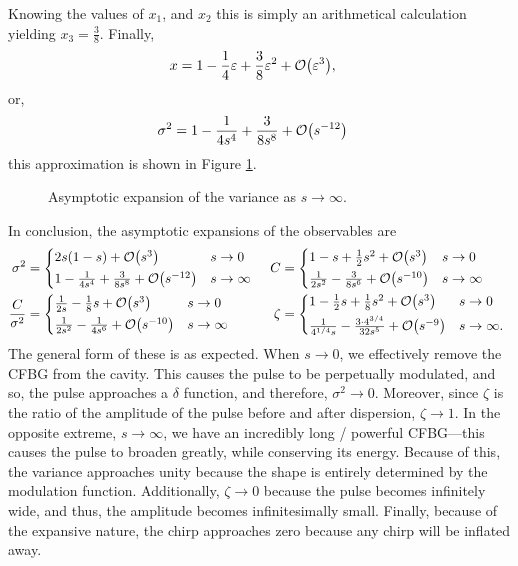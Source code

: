 Knowing the values of $x_1$, and $x_2$ this is simply an arithmetical calculation yielding $x_3 = \frac{3}{8}$. Finally,
\begin{align*}
x &= 1 - \frac{1}{4}\eps + \frac{3}{8}\eps^2 + \bigO{\eps^3},
\end{align*}
or,
\begin{align*}
\sigma^2 &= 1 - \frac{1}{4s^4} + \frac{3}{8s^8} + \bigO{s^{-12}}
\end{align*}
this approximation is shown in Figure \ref{fig:limsinfty}. \\
\begin{figure}[tbp]

\caption{Asymptotic expansion of the variance as $s \rightarrow \infty$.}
\label{fig:limsinfty}
\end{figure}

In conclusion, the asymptotic expansions of the observables are
\begin{align*}
\sigma^2 &=
\begin{cases*}
2s(1 - s) + \bigO{s^3} & $s \rightarrow 0$ \\
1 - \frac{1}{4s^4} + \frac{3}{8s^8} + \bigO{s^{-12}} & $s \rightarrow \infty$
\end{cases*}
& C &=
\begin{cases*}
1 - s + \frac{1}{2}s^2 + \bigO{s^3} & $s \rightarrow 0$ \\
\frac{1}{2s^2} - \frac{3}{8s^6} + \bigO{s^{-10}} & $s \rightarrow \infty$
\end{cases*} \\
\frac{C}{\sigma^2} &=
\begin{cases*}
\frac{1}{2s} - \frac{1}{8}s + \bigO{s^3} & $s \rightarrow 0$ \\
\frac{1}{2s^2} - \frac{1}{4s^6} + \bigO{s^{-10}} & $s \rightarrow \infty$
\end{cases*}
& \zeta &=
\begin{cases*}
1 - \frac{1}{2}s + \frac{1}{8}s^2 + \bigO{s^3} & $s \rightarrow 0$ \\
\frac{1}{4^{1/4}s} - \frac{3 \cdot 4^{3/4}}{32 s^5} + \bigO{s^{-9}} & $s \rightarrow \infty$.
\end{cases*}
\end{align*}
The general form of these is as expected. When $s \rightarrow 0$, we effectively remove the CFBG from the cavity. This causes the pulse to be perpetually modulated, and so, the pulse approaches a $\delta$ function, and therefore, $\sigma^2 \rightarrow 0$. Moreover, since $\zeta$ is the ratio of the amplitude of the pulse before and after dispersion, $\zeta \rightarrow 1$. In the opposite extreme, $s \rightarrow \infty$, we have an incredibly long / powerful CFBG---this causes the pulse to broaden greatly, while conserving its energy. Because of this, the variance approaches unity because the shape is entirely determined by the modulation function. Additionally, $\zeta \rightarrow 0$ because the pulse becomes infinitely wide, and thus, the amplitude becomes infinitesimally small. Finally, because of the expansive nature, the chirp approaches zero because any chirp will be inflated away. \\
